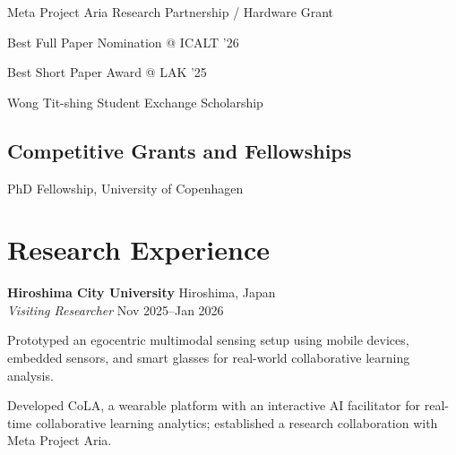 \documentclass[11pt,letterpaper]{report}
\newcommand{\listitemspace}{0.25em}
\begin{document}
    \begin{tablist}
        \item[2026] \tab{}Meta Project Aria Research Partnership / Hardware Grant
        \item[2026] \tab{}Best Full Paper Nomination @ ICALT '26
        \item[2025] \tab{}Best Short Paper Award @ LAK '25
        \item[2017] \tab{}Wong Tit-shing Student Exchange Scholarship
    \end{tablist}

    \subsection*{Competitive Grants and Fellowships}

    \begin{tablist}
        \item[2024--2027] \tab{}PhD Fellowship, University of Copenhagen
    \end{tablist}

    \section*{Research Experience}

    \noindent \textbf{Hiroshima City University} \hfill Hiroshima, Japan \\
    \textit{Visiting Researcher} \hfill Nov 2025--Jan 2026
    \begin{list}{\textbullet}{\setlength{\leftmargin}{1.2em}
                   \setlength{\labelsep}{0.5em}
                   \setlength{\itemsep}{\listitemspace}
                   \setlength{\parsep}{\listitemspace}}
        \item Prototyped an egocentric multimodal sensing setup using mobile devices, embedded sensors, and smart glasses for real-world collaborative learning analysis.
        \item Developed CoLA, a wearable platform with an interactive AI facilitator for real-time collaborative learning analytics; established a research collaboration with Meta Project Aria.
    \end{list}
    \vspace{0.8em}
\end{document}
